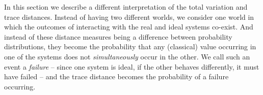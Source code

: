 In this section we describe a different interpretation of the total
variation and trace distances. Instead of having two different worlds,
we consider one world in which the outcomes of interacting with the
real and ideal systems co-exist. And instead of these distance
measures being a difference between probability distributions, they
become the probability that any (classical) value occurring in one of
the systems does not \emph{simultaneously} occur in the other. We call
such an event a \emph{failure} \--- since one system is ideal, if the
other behaves differently, it must have failed \--- and the trace
distance becomes the probability of a failure occurring.






